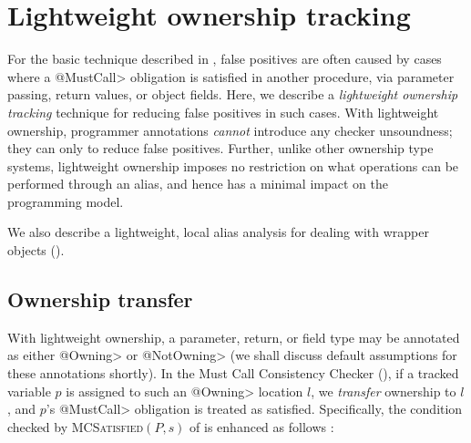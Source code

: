 \section{Lightweight ownership tracking}
\label{sec:lightweight-ownership}

For the basic technique described in , false
positives are often caused by cases where a \<@MustCall> obligation is satisfied
in another procedure, via parameter passing, return values, or object fields.
Here, we describe a \emph{lightweight ownership tracking} technique for reducing
false positives in such cases.  With lightweight ownership, programmer
annotations \emph{cannot} introduce any checker unsoundness; they can only to
reduce false positives.  Further, unlike other ownership type systems,
lightweight ownership imposes no restriction on what operations can be performed
through an alias, and hence has a minimal impact on the programming model.


We also describe a lightweight, local alias analysis for dealing with wrapper
objects ().

\subsection{Ownership transfer}
\label{sec:ownership-transfer}


With lightweight ownership, a parameter, return, or field type may be annotated
as either \<@Owning> or \<@NotOwning> (we shall discuss default assumptions for
these annotations shortly).  In
the Must Call Consistency Checker (), if a tracked
variable $p$ is assigned to such an \<@Owning> location $l$, we \emph{transfer}
ownership to $l$, and $p$'s \<@MustCall> obligation
is treated as satisfied. Specifically, the condition checked by
\textsc{MCSatisfied}$(P,s)$ of  is enhanced as follows
:

